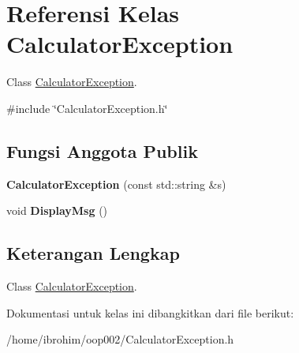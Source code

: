 \hypertarget{classCalculatorException}{}\section{Referensi Kelas Calculator\+Exception}
\label{classCalculatorException}


Class \hyperlink{classCalculatorException}{Calculator\+Exception}.  




{\ttfamily \#include \char`\"{}Calculator\+Exception.\+h\char`\"{}}

\subsection*{Fungsi Anggota Publik}
\begin{DoxyCompactItemize}
\item 
\hypertarget{classCalculatorException_a78b684af841080ee80a6dacbe5a84c7c}{}{\bfseries Calculator\+Exception} (const std\+::string \&s)\label{classCalculatorException_a78b684af841080ee80a6dacbe5a84c7c}

\item 
\hypertarget{classCalculatorException_abb4d4e6abe0c3c13d1b9e28e88bf449c}{}void {\bfseries Display\+Msg} ()\label{classCalculatorException_abb4d4e6abe0c3c13d1b9e28e88bf449c}

\end{DoxyCompactItemize}


\subsection{Keterangan Lengkap}
Class \hyperlink{classCalculatorException}{Calculator\+Exception}. 

Dokumentasi untuk kelas ini dibangkitkan dari file berikut\+:\begin{DoxyCompactItemize}
\item 
/home/ibrohim/oop002/Calculator\+Exception.\+h\end{DoxyCompactItemize}
